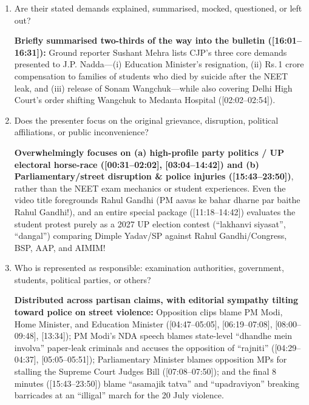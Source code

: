 \documentclass[10pt,a4paper]{article}
\begin{document}
{\begin{enumerate}[leftmargin=1.5em, itemsep=6pt, topsep=4pt]
  \textbf{Ground \& Police Segment ([15:43--23:50]):} Reporter Sushant Mehra introduces ``asamajik tatva'' [anti-social elements] ([15:52]), and the anchor explicitly adopts ``upadraviyon'' [rioters/miscreants] (``kaise upadraviyon ne police valon ko nishana banaya'', [21:20]; ``upadravi unke chehre par hamla kar rahe the'', [22:38])!
  \item Are their stated demands explained, summarised, mocked, questioned, or left out?\par\smallskip
  \textbf{Briefly summarised two-thirds of the way into the bulletin ([16:01--16:31]):} Ground reporter Sushant Mehra lists CJP's three core demands presented to J.P. Nadda---(i) Education Minister's resignation, (ii) Rs.\,1 crore compensation to families of students who died by suicide after the NEET leak, and (iii) release of Sonam Wangchuk---while also covering Delhi High Court's order shifting Wangchuk to Medanta Hospital ([02:02--02:54]).
  \item Does the presenter focus on the original grievance, disruption, political affiliations, or public inconvenience?\par\smallskip
  \textbf{Overwhelmingly focuses on (a) high-profile party politics / UP electoral horse-race ([00:31--02:02], [03:04--14:42]) and (b) Parliamentary/street disruption \& police injuries ([15:43--23:50])}, rather than the NEET exam mechanics or student experiences. Even the video title foregrounds Rahul Gandhi (PM aavas ke bahar dharne par baithe Rahul Gandhi!), and an entire special package ([11:18--14:42]) evaluates the student protest purely as a 2027 UP election contest (``lakhanvi siyasat'', ``dangal'') comparing Dimple Yadav/SP against Rahul Gandhi/Congress, BSP, AAP, and AIMIM!
  \item Who is represented as responsible: examination authorities, government, students, political parties, or others?\par\smallskip
  \textbf{Distributed across partisan claims, with editorial sympathy tilting toward police on street violence:} Opposition clips blame PM Modi, Home Minister, and Education Minister ([04:47--05:05], [06:19--07:08], [08:00--09:48], [13:34]); PM Modi's NDA speech blames state-level ``dhandhe mein involva'' paper-leak criminals and accuses the opposition of ``rajniti'' ([04:29--04:37], [05:05--05:51]); Parliamentary Minister blames opposition MPs for stalling the Supreme Court Judges Bill ([07:08--07:50]); and the final 8 minutes ([15:43--23:50]) blame ``asamajik tatva'' and ``upadraviyon'' breaking barricades at an ``illigal'' march for the 20 July violence.

\end{enumerate}}
\end{document}
